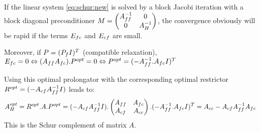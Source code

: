 If the linear system \eqref{eq:schur:new} is solved by a block Jacobi iteration with a block diagonal
preconditioner 
$M = \begin{pmatrix}
A_{ff}^{-1} & 0\\
0 & A_{H }^{-1} \\
\end{pmatrix}$,
the convergence obviously will be rapid if the terms $E_{fc}$ and $E_{cf}$ are small.

Moreover, if $P = (P_f I)^T$ (compatible relaxation), 
$E_{fc} = 0 \Leftrightarrow (A_{ff} A_{fc}).P^{opt} = 0 \Leftrightarrow P^{opt}=(-A_{ff}^{-1}.A_{fc} I)^T$

Using this optimal prolongator with the corresponding optimal restrictor $R^{opt} = (-A_{cf}A_{ff}^{-1} I)$ leads to:
$$A_H^{opt} = R^{opt}.A.P^{opt} = (-A_{cf}A_{ff}^{-1} I) .
\begin{pmatrix}
A_{ff} & A_{fc} \\
A_{cf} & A_{cc} \\
\end{pmatrix} .
(-A_{ff}^{-1}.A_{fc} I)^T = A_{cc} - A_{cf}A_{ff}^{-1}A_{fc}
$$
This is the Schur complement of matrix $A$.
